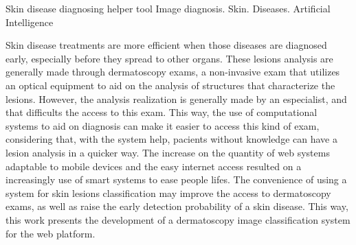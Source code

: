\documentclass[openright]{ifrs} %
\begin{document}
\begin{englishabstract}
{Skin disease diagnosing helper tool}
{Image diagnosis. Skin. Diseases. Artificial Intelligence}

Skin disease treatments are more efficient when those diseases are diagnosed early, especially before they spread to other organs.
These lesions analysis are generally made through dermatoscopy exams, a non-invasive exam that utilizes an optical equipment to aid on the analysis of structures that characterize the lesions. However, the analysis realization is generally made by an especialist, and that  difficults the access to this exam. This way, the use of computational systems to aid on diagnosis can make it easier to access this kind of exam, considering that, with the system help, pacients without knowledge can have a lesion analysis in a quicker way. The increase on the quantity of web systems adaptable to mobile devices and the easy internet access  resulted on a increasingly use of smart systems to ease people lifes. The convenience of using a system for skin lesions classification may improve the access to dermatoscopy exams, as well as raise the early detection probability of a skin disease.
This way, this work presents the development of a dermatoscopy image classification system for the web platform.
\end{englishabstract}
\end{document}
